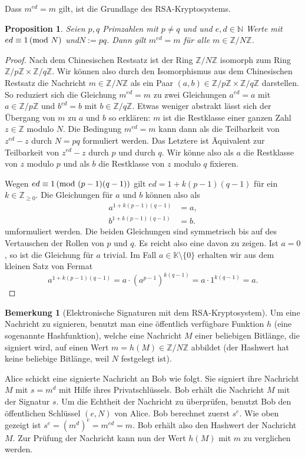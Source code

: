 \documentclass[
a4paper,landscape,16pt,
bibliography=totocnumbered,
numbers=noenddot,
]{scrartcl}
\numberwithin{equation}{subsection}
\newcommand{\N}{\mathbb N}
\newcommand{\Z}{\mathbb Z}
\newcommand{\K}{\mathbb K}
\theoremstyle{plain}
\newtheorem*{propn}{Proposition}
\theoremstyle{definition}
\newtheorem*{bem}{Bemerkung}
\begin{document}
	Dass $m^{ed} = m$ gilt, ist die Grundlage des RSA-Kryptosystems. 
	
	\begin{propn}
		Seien $p,q$ Primzahlen mit $p \ne q$ und und $e ,d \in \N$ Werte mit $ed \equiv 1 \,(\mathrm{mod} \ N)$ und$N:=pq$. Dann gilt $m^{ed} = m$ für alle $m \in \Z / N \Z$. 
	\end{propn} 
	\begin{proof} 
	 Nach dem Chinesischen Restsatz ist der Ring $\Z / N \Z$ isomorph zum Ring $\Z / p \Z \times \Z / q \Z$. Wir können also durch den Isomorphismus aus dem Chinesischen Restsatz die Nachricht $m \in \Z / N \Z$ als ein Paar $(a,b) \in \Z / p \Z \times \Z / q\Z$ darstellen. So reduziert sich die Gleichung $m^{ed} = m$ zu zwei Gleichungen $a^{ed} = a$ mit $a \in \Z/ p \Z$ und $b^{ed} = b$ mit $b \in \Z / q \Z$.  Etwas weniger abstrakt lässt sich der Übergang von $m$ zu $a$ und $b$ so erklären: $m $ ist die Restklasse einer ganzen Zahl $z \in \Z$ modulo $N$. Die Bedingung $m^{ed} =m$ kann dann als die Teilbarkeit von $z^{ed} - z$ durch $N = pq$ formuliert werden. Das Letztere ist Äquivalent zur Teilbarkeit von $z^{ed} - z$ durch $p$ und durch $q$. Wir könne also als $a$ die Restklasse von $z$ modulo $p$ und als $b$ die Restklasse von $z$ modulo $q$ fixieren.
	
	Wegen $ed \equiv 1 \,(\mathrm{mod} \ (p-1)(q-1))$ gilt $ed = 1 + k (p-1)(q-1)$ für ein $k \in \Z_{\ge 0}$. Die Gleichungen für $a$ und $b$ können also als 
	\begin{align*}
			a^{1 + k (p-1) (q-1) } & = a, 
		\\ b^{1 + k (p-1) (q-1) } & =b. 
	\end{align*}
	umformuliert werden.  Die beiden Gleichungen sind symmetrisch bis auf des Vertauschen der Rollen von $p$ und $q$. Es reicht also eine davon zu zeigen. Ist $a=0$, so ist die Gleichung für $a$ trivial. Im Fall $a \in \K \setminus \{0\}$ erhalten wir aus dem kleinen Satz von Fermat
	\[
		a^{1 + k (p-1) (q-1)}  = a \cdot (a^{p-1})^{k (q-1)} = a \cdot 1^{k(q-1)} = a.
	\]
	\end{proof} 

\begin{bem}[Elektronische Signaturen mit dem RSA-Kryptosystem] 
	Um eine Nachricht zu signieren, benutzt man eine öffentlich verfügbare Funktion $h$ (eine sogenannte Hashfunktion), welche eine  Nachricht $M$ einer beliebigen Bitlänge, die signiert wird, auf einen Wert $m = h(M) \in \Z / N \Z$ abbildet (der Hashwert hat keine beliebige Bitlänge, weil $N$ festgelegt ist). 
	
	Alice schickt eine signierte Nachricht an Bob wie folgt. Sie signiert ihre Nachricht $M$ mit $s=m^d$ mit Hilfe ihres Privatschlüssels. Bob erhält die Nachricht $M$ mit der Signatur $s$. Um die Echtheit der Nachricht zu überprüfen, benutzt Bob den öffentlichen Schlüssel $(e,N)$ von Alice. Bob berechnet zuerst $s^e$. Wie oben gezeigt ist $s^e = (m^d)^e = m^{ed} = m$. Bob erhält also den Hashwert der Nachricht $M$. Zur Prüfung der Nachricht kann nun der Wert $h(M)$ mit $m$ zu verglichen werden. 
\end{bem} 
\end{document}
